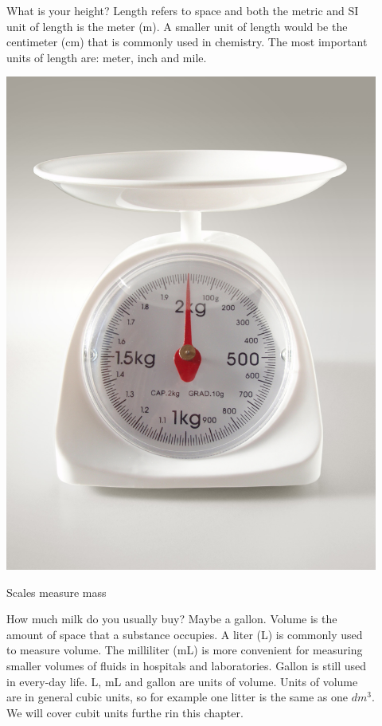 \documentclass[main.tex]{subfiles}
\begin{document}
\begin{description}
\item[] What is your height? Length refers to space and  both the metric and SI unit of length is the meter (m). A smaller unit of length would be the centimeter (cm) that is  commonly used in chemistry. The most important units of length are: meter, inch and mile.
  
 
\begin{marginfigure}
      \includegraphics{chapter1/figure1-1}
      \caption{Scales measure mass}
      \label{fig:marginfig}
   \end{marginfigure}
\item[] How much milk do you usually buy? Maybe a gallon. Volume is the amount of space that a substance occupies. A liter (L) is commonly used to measure volume. The milliliter (mL) is more convenient for measuring smaller volumes of fluids in hospitals and laboratories. Gallon is still used in every-day life.  L, mL and gallon are units of volume. Units of volume are in general cubic units, so for example one litter is the same as one $dm^3$. We will cover cubit units furthe rin this chapter.


\end{description}
\end{document}
